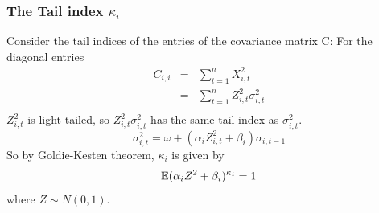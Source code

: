 \documentclass{beamer}
\begin{document}
\begin{frame}
  \frametitle{The Tail index $\kappa_i$}
  Consider the tail indices of the entries of the covariance matrix C:
  For the diagonal entries
    \begin{eqnarray*}
      C_{i, i} &=& \sum_{t=1}^n X_{i, t}^2 \\
               &=& \sum_{t=1}^n Z_{i, t}^2 \sigma_{i, t}^2 \\
    \end{eqnarray*}
    $Z_{i, t}^2$ is light tailed, so $Z_{i, t}^2 \sigma_{i, t}^2$ has
    the same tail index as $\sigma_{i, t}^2$.
    \[
    \sigma_{i, t}^2 = \omega + (\alpha_i Z_{i,t}^2 + \beta_i)\sigma_{i,t-1}
    \]
    So by Goldie-Kesten theorem, $\kappa_i$ is given by
    \[
    \mathbb{E} (\alpha_i Z^2 + \beta_i)^{\kappa_i} = 1
    \]
    where $Z \sim N(0, 1)$.
  \end{frame}
\end{document}
